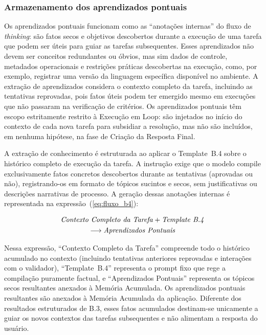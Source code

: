 \documentclass[a4paper,10pt,twocolumn]{article}
\begin{document}
\subsubsection{Armazenamento dos aprendizados pontuais} \label{subsec:ExecucaoB4}

Os aprendizados pontuais funcionam como as ``anotações internas'' do fluxo de \textit{thinking}: são fatos secos e objetivos descobertos durante a execução de uma tarefa que podem ser úteis para guiar as tarefas subsequentes. Esses aprendizados não devem ser conceitos redundantes ou óbvios, mas sim dados de controle, metadados operacionais e restrições práticas descobertas na execução, como, por exemplo, registrar uma versão da linguagem específica disponível no ambiente. A extração de aprendizados considera o contexto completo da tarefa, incluindo as tentativas reprovadas, pois fatos úteis podem ter emergido mesmo em execuções que não passaram na verificação de critérios. Os aprendizados pontuais têm escopo estritamente restrito à Execução em Loop: são injetados no início do contexto de cada nova tarefa para subsidiar a resolução, mas não são incluídos, em nenhuma hipótese, na fase de Criação da Resposta Final.

A extração de conhecimento é estruturada ao aplicar o Template~B.4 sobre o histórico completo de execução da tarefa. A instrução exige que o modelo compile exclusivamente fatos concretos descobertos durante as tentativas (aprovadas ou não), registrando-os em formato de tópicos sucintos e secos, sem justificativas ou descrições narrativas de processo. A geração dessas anotações internas é representada na expressão~(\ref{eq:fluxo_b4}):

\begin{multline} \label{eq:fluxo_b4}
\text{\textit{Contexto Completo da Tarefa}} + \text{\textit{Template B.4}} \\
\longrightarrow \text{\textit{Aprendizados Pontuais}}
\end{multline}

Nessa expressão, ``Contexto Completo da Tarefa'' compreende todo o histórico acumulado no contexto (incluindo tentativas anteriores reprovadas e interações com o validador), ``Template~B.4'' representa o prompt fixo que rege a compilação puramente factual, e ``Aprendizados Pontuais'' representa os tópicos secos resultantes anexados à Memória Acumulada. Os aprendizados pontuais resultantes são anexados à Memória Acumulada da aplicação. Diferente dos resultados estruturados de B.3, esses fatos acumulados destinam-se unicamente a guiar os novos contextos das tarefas subsequentes e não alimentam a resposta do usuário.
\end{document}
